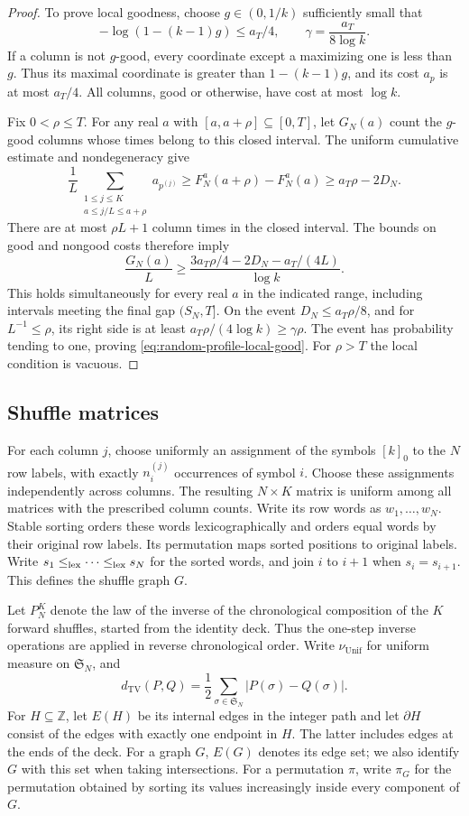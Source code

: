 \documentclass[11pt]{article}
\numberwithin{equation}{section}
\theoremstyle{definition}
\theoremstyle{remark}
\newcommand{\TV}{\mathrm{TV}}
\newcommand{\Unif}{\mathrm{Unif}}
\newcommand{\dTV}{d_{\TV}}
\newcommand{\nuUnif}{\nu_{\Unif}}
\newcommand{\1}{\mathbf 1}
\begin{document}
\begin{proof}
To prove local goodness, choose $g\in(0,1/k)$ sufficiently small
that
\[
 -\log(1-(k-1)g)\le a_T/4,
 \qquad \gamma=\frac{a_T}{8\log k}.
\]
If a column is not $g$-good, every coordinate except a maximizing
one is less than $g$. Thus its maximal coordinate is greater than
$1-(k-1)g$, and its cost $a_p$ is at most $a_T/4$.
All columns, good or otherwise, have cost at most $\log k$.

Fix $0<\rho\le T$. For any real $a$ with
$[a,a+\rho]\subseteq[0,T]$, let $G_N(a)$ count the $g$-good
columns whose times belong to this closed interval. The uniform
cumulative estimate and nondegeneracy give
\[
 \frac1L\sum_{\substack{1\le j\le K\\a\le j/L\le a+\rho}}
         a_{p^{(j)}}
 \ge F_N^a(a+\rho)-F_N^a(a)
 \ge a_T\rho-2D_N.
\]
There are at most $\rho L+1$ column times in the closed interval.
The bounds on good and nongood costs therefore imply
\[
 \frac{G_N(a)}L
 \ge\frac{3a_T\rho/4-2D_N-a_T/(4L)}{\log k}.
\]
This holds simultaneously for every real $a$ in the indicated range,
including intervals meeting the final gap $(S_N,T]$. On the event
$D_N\le a_T\rho/8$, and for $L^{-1}\le\rho$, its right side is
at least $a_T\rho/(4\log k)\ge\gamma\rho$.
The event has probability tending to one, proving
\eqref{eq:random-profile-local-good}. For $\rho>T$ the local
condition is vacuous.
\end{proof}


\subsection{Shuffle matrices}
For each column $j$, choose uniformly an assignment of the symbols
$[k]_0$ to the $N$ row labels, with exactly $n_i^{(j)}$ occurrences of
symbol $i$. Choose these assignments independently across columns.
The resulting $N\times K$ matrix is uniform among all matrices with
the prescribed column counts. Write its row words as $w_1,\ldots,w_N$.
Stable sorting orders these words lexicographically and orders equal
words by their original row labels. Its permutation maps sorted
positions to original labels. Write $s_1\le_{\rm lex}\cdots\le_{\rm lex}s_N$
for the sorted words, and join $i$ to $i+1$ when $s_i=s_{i+1}$.
This defines the shuffle graph $G$.

Let $P_N^K$ denote the law of the inverse of the chronological
composition of the $K$ forward shuffles, started from the identity
deck. Thus the one-step inverse operations are applied in reverse
chronological order. Write $\nuUnif$ for uniform measure on
$\mathfrak S_N$, and
\[
 \dTV(P,Q)=\frac12\sum_{\sigma\in\mathfrak S_N}|P(\sigma)-Q(\sigma)|.
\]
For $H\subseteq\mathbb Z$, let $E(H)$ be its internal edges in the
integer path and let $\partial H$ consist of the edges with exactly
one endpoint in $H$. The latter includes edges at the ends of the
deck. For a graph $G$, $E(G)$ denotes its edge set; we also identify
$G$ with this set when taking intersections. For a permutation $\pi$,
write $\pi_G$ for the permutation obtained by sorting its values
increasingly inside every component of $G$.
\end{document}
